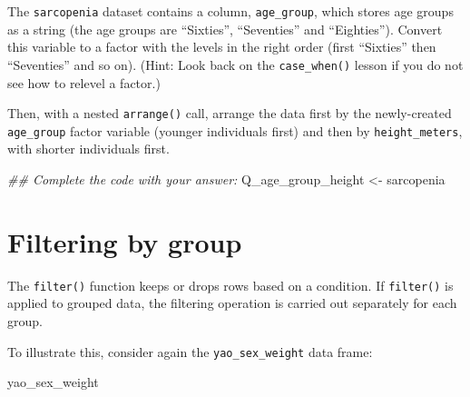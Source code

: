 \documentclass[
  letterpaper,
  DIV=11,
  numbers=noendperiod]{scrreprt}
\newenvironment{Shaded}{\begin{snugshade}}{\end{snugshade}}
\newcommand{\DocumentationTok}[1]{\textcolor[rgb]{0.37,0.37,0.37}{\textit{#1}}}
\newcommand{\NormalTok}[1]{\textcolor[rgb]{0.00,0.23,0.31}{#1}}
\newcommand{\OtherTok}[1]{\textcolor[rgb]{0.00,0.23,0.31}{#1}}
\begin{document}
\begin{tcolorbox}[enhanced jigsaw, titlerule=0mm, colback=white, left=2mm, breakable, opacitybacktitle=0.6, colbacktitle=quarto-callout-tip-color!10!white, colframe=quarto-callout-tip-color-frame, bottomtitle=1mm, opacityback=0, coltitle=black, arc=.35mm, toptitle=1mm, title=\textcolor{quarto-callout-tip-color}{\faLightbulb}\hspace{0.5em}{Practice}, leftrule=.75mm, toprule=.15mm, bottomrule=.15mm, rightrule=.15mm]

The \texttt{sarcopenia} dataset contains a column, \texttt{age\_group},
which stores age groups as a string (the age groups are ``Sixties'',
``Seventies'' and ``Eighties''). Convert this variable to a factor with
the levels in the right order (first ``Sixties'' then ``Seventies'' and
so on). (Hint: Look back on the \texttt{case\_when()} lesson if you do
not see how to relevel a factor.)

Then, with a nested \texttt{arrange()} call, arrange the data first by
the newly-created \texttt{age\_group} factor variable (younger
individuals first) and then by \texttt{height\_meters}, with shorter
individuals first.

\begin{Shaded}
\begin{Highlighting}[]
\DocumentationTok{\#\# Complete the code with your answer:}
\NormalTok{Q\_age\_group\_height }\OtherTok{\textless{}{-}} 
\NormalTok{  sarcopenia }
\end{Highlighting}
\end{Shaded}

\end{tcolorbox}

\section{Filtering by group}\label{filtering-by-group}

The \texttt{filter()} function keeps or drops rows based on a condition.
If \texttt{filter()} is applied to grouped data, the filtering operation
is carried out separately for each group.

To illustrate this, consider again the \texttt{yao\_sex\_weight} data
frame:

\begin{Shaded}
\begin{Highlighting}[]
\NormalTok{yao\_sex\_weight}
\end{Highlighting}
\end{Shaded}
\end{document}
